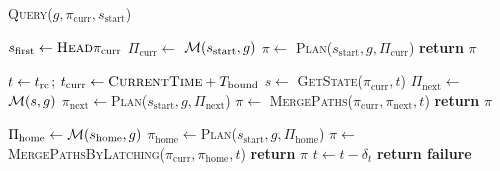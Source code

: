 \documentclass[a4paper,10pt]{article}
\begin{document}
\begin{algorithm}[t]
\caption{\textsc{Query}($g, \pi_{\textrm{curr}},s_{\textrm{start}}$)}\label{alg:query}  
    \AlgFontSize
\begin{algorithmic}[1]
    \State $s_{\rm first} \leftarrow \textsc{Head}  \pi_{\textrm{curr}}$ 
        \label{alg:query:line:c1a}
    \State $\Pi_{\textrm{curr}} \leftarrow$ $\mathcal{M}(s_{\textrm{start}},g)$ 
    \State $\pi \leftarrow$ \textsc{Plan}($s_{\textrm{start}},g,\Pi_{\textrm{curr}}$)
    \If{$\pi \neq  = \emptyset$}
        \State \textbf{return} $\pi$
        \label{alg:query:line:c1b}
    \EndIf
\vspace{2mm}

\State $t \leftarrow t_{\textrm{rc}}$; \hspace{3mm} $t_{\textrm{curr}}\leftarrow \textsc{CurrentTime} + T_{\textrm{bound}}$
    \State $s \leftarrow$ \textsc{GetState}($\pi_{\textrm{curr}}, t$)
        \label{alg:query:line:c2a}
    \State $\Pi_{\textrm{next}} \leftarrow$ $\mathcal{M}(s,g)$ 
        \State $\pi_{\textrm{next}} \leftarrow$\textsc{Plan}($s_{\textrm{start}},g,\Pi_{\textrm{next}}$)
        \State $\pi \leftarrow$ \textsc{MergePaths}($\pi_{\textrm{curr}},\pi_{\textrm{next}},t$)
        \State \textbf{return} $\pi$
        \label{alg:query:line:c2b}
    \EndIf

\vspace{2mm}

    \State $\Pi_{\textrm{home}} \leftarrow \mathcal{M} (s_{\textrm{home}},g)$
     \label{alg:query:line:c3a}
            \State $\pi_{\textrm{home}} \leftarrow$\textsc{Plan}($s_{\textrm{start}},g,\Pi_{\textrm{home}}$)
            \State $\pi \leftarrow$ \textsc{MergePathsByLatching}($\pi_{\textrm{curr}},\pi_{\textrm{home}}, t$)
            \State \textbf{return} $\pi$
            \label{alg:query:line:c3b}
        \EndIf
    \EndIf
    \State $t \leftarrow t - \delta_t$
\EndWhile
\State \textbf{return failure}
\end{algorithmic}
\end{algorithm}
\end{document}
